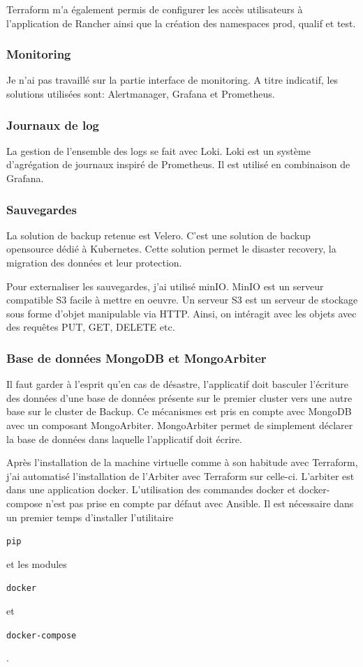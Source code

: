 \documentclass[12pt, a4paper, twoside]{article}
\begin{document}
\gls{Terraform} m'a également permis de configurer les accès utilisateurs à l'application de Rancher ainsi que la création des namespaces prod, qualif et test.

\subsubsection{Monitoring}
Je n'ai pas travaillé sur la partie interface de monitoring.
A titre indicatif, les solutions utilisées sont: Alertmanager, Grafana et Prometheus.

\subsubsection{Journaux de log}
La gestion de l'ensemble des logs se fait avec Loki.
Loki est un système d'agrégation de journaux inspiré de Prometheus.
Il est utilisé en combinaison de Grafana.

\subsubsection{Sauvegardes}
La solution de backup retenue est Velero.
C'est une solution de backup opensource dédié à \gls{Kubernetes}.
Cette solution permet le disaster recovery, la migration des données et leur protection.

Pour externaliser les sauvegardes, j'ai utilisé minIO.
MinIO est un serveur compatible S3 facile à mettre en oeuvre.
Un serveur S3 est un serveur de stockage sous forme d'objet manipulable via HTTP.
Ainsi, on intéragit avec les objets avec des requêtes PUT, GET, DELETE etc.

\subsubsection{Base de données MongoDB et MongoArbiter}
Il faut garder à l'esprit qu'en cas de désastre, l'applicatif doit basculer l'écriture des données d'une base de données présente sur le premier \gls{cluster} vers une autre base sur le \gls{cluster} de Backup.
Ce mécanismes est pris en compte avec MongoDB avec un composant MongoArbiter.
MongoArbiter permet de simplement déclarer la base de données dans laquelle l'applicatif doit écrire.

Après l'installation de la machine virtuelle comme à son habitude avec \gls{Terraform}, j'ai automatisé l'installation de l'Arbiter avec \gls{Terraform} sur celle-ci.
L'arbiter est dans une application docker.
L'utilisation des commandes docker et docker-compose n'est pas prise en compte par défaut avec \gls{Ansible}.
Il est nécessaire dans un premier temps d'installer l'utilitaire \begin{code}\texttt{pip}\end{code} et les modules \begin{code}\texttt{docker}\end{code} et \begin{code}\texttt{docker-compose}\end{code}.
\end{document}
